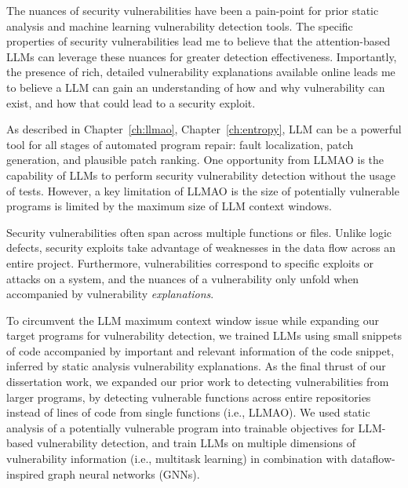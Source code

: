 \documentclass[12pt,openany,oneside,table]{cmuthesis}
\begin{document}
The nuances of security vulnerabilities have been a pain-point for prior static analysis and machine learning vulnerability detection tools. The specific properties of security vulnerabilities lead me to believe that the attention-based LLMs can leverage these nuances for greater detection effectiveness. Importantly, the presence of rich, detailed vulnerability explanations available online leads me to believe a LLM can gain an understanding of how and why vulnerability can exist, and how that could lead to a security exploit. 

As described in Chapter~\ref{ch:llmao}, Chapter~\ref{ch:entropy}, LLM can be a powerful tool for all stages of automated program repair: fault localization, patch generation, and plausible patch ranking. One opportunity from LLMAO is the capability of LLMs to perform security vulnerability detection without the usage of tests. 
However, a key limitation of LLMAO is the size of potentially vulnerable programs is limited by the maximum size of LLM context windows.

Security vulnerabilities often span across multiple functions or files. Unlike logic defects, security exploits take advantage of weaknesses in the data flow across an entire project. Furthermore, vulnerabilities correspond to specific exploits or attacks on a system, and the nuances of a vulnerability only unfold when accompanied by vulnerability \textit{explanations}.

To circumvent the LLM maximum context window issue while expanding our target programs for vulnerability detection, we trained LLMs using small snippets of code accompanied by important and relevant information of the code snippet, inferred by static analysis vulnerability explanations. As the final thrust of our dissertation work, we expanded our prior work to detecting vulnerabilities from larger programs, by detecting vulnerable functions across entire repositories instead of lines of code from single functions (i.e., LLMAO). We used static analysis of a potentially vulnerable program into trainable objectives for LLM-based vulnerability detection, and train LLMs on multiple dimensions of vulnerability information (i.e., multitask learning) in combination with dataflow-inspired graph neural networks (GNNs). 
\end{document}

